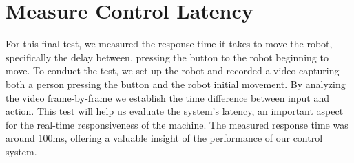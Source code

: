 \section{Measure Control Latency}
For this final test, we measured the response time it takes to move the robot, specifically the delay between,  pressing the button to the robot beginning to move. 
To conduct the test, we set up the robot and recorded a video capturing both a person pressing the button and the robot initial movement. 
By analyzing the video frame-by-frame we establish the time difference between input and action. 
This test will help us evaluate the system's latency, an important aspect for the real-time responsiveness of the machine. 
The measured response time was around 100ms, offering a valuable insight of the performance of our control system.
